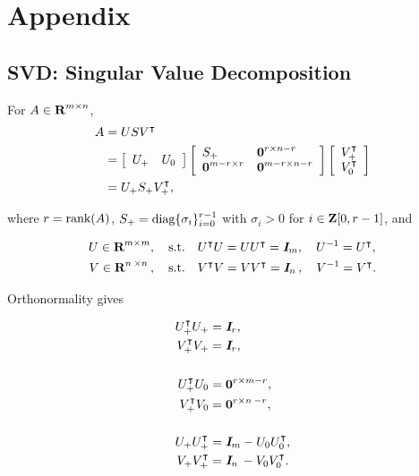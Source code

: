 \documentclass{article}
\begin{document}
\clearpage 

\section{Appendix}

\subsection{SVD: Singular Value Decomposition}

    For $A\in\textbf{R}^{m\times n}$,
    \begin{align*}
        A   &=U S V^\intercal\\
            &=\left[
            \begin{array}{ll}
                U_+ & U_0
            \end{array}    
            \right]
            \left[
                \begin{array}{ll}
                    S_+ & \textbf{0}^{r\times n-r}\\
                    \textbf{0}^{m-r\times r} & \textbf{0}^{m-r\times n-r}
                \end{array}    
                \right]
            \left[
            \begin{array}{l}
                V_+^\intercal \\
                V_0^\intercal
            \end{array}    
            \right]\\
            &= U_+ S_+ V_+^\intercal,
    \end{align*}

    where $r = \text{rank}(A)$, $S_+=\text{diag}\{\sigma_i\}_{i=0}^{r-1}$ 
    with $\sigma_i>0$ for $i\in\textbf{Z}[0,r-1]$, and

    \begin{align*}
        U\in\textbf{R}^{m\times m},\quad\text{s.t.}\quad &U^\intercal U = UU^\intercal = \emph{\textbf{I}}_m,\quad U^{-1}=U^\intercal,\\
        V\in\textbf{R}^{n\:\times n\:},\quad\text{s.t.}\quad &V^\intercal V = VV^\intercal = \emph{\textbf{I}}_{n\:},\quad V^{-1}=V^\intercal.
    \end{align*}

    Orthonormality gives

    \begin{align*}
        U_+^\intercal U_+  &= \emph{\textbf{I}}_r, \\
        V_+^\intercal V_+  &= \emph{\textbf{I}}_r, \\\\
        U_+^\intercal U_0  &= \textbf{0}^{r \times m-r}, \\
        V_+^\intercal V_0  &= \textbf{0}^{r \times {n\:}-r},\\\\
        U_+ U_+^\intercal &= \emph{\textbf{I}} _m - U_0U_0^\intercal, \\
        V_+ V_+^\intercal &= \emph{\textbf{I}} _{n\:} - V_0V_0^\intercal.
    \end{align*}
    
\end{document}
